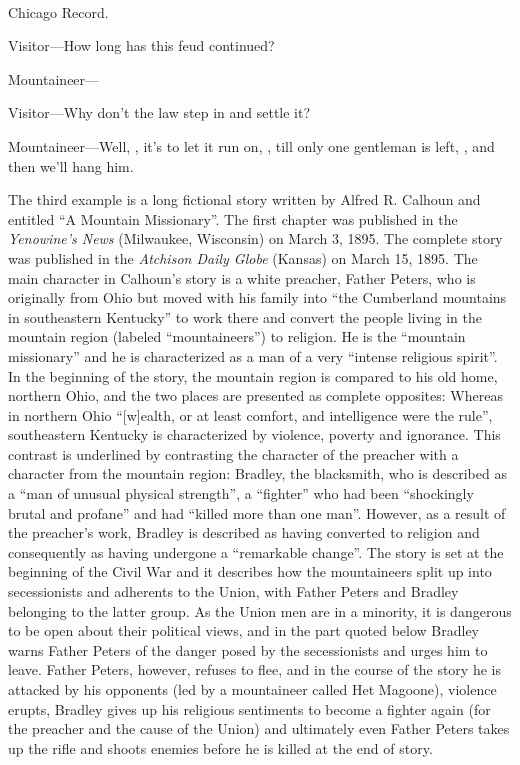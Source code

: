 \begin{ipquote}
\begin{center}
\\
Chicago Record.    
\end{center}

Visitor—How long has this feud continued?

Mountaineer—

Visitor—Why don’t the law step in and settle it?

Mountaineer—Well, , it’s  to let it run on, , till only one gentleman is left, , and then we’ll hang him.
\end{ipquote}

The third example is a long fictional story written by Alfred R. Calhoun and entitled “A Mountain Missionary”. The first chapter was published in the \emph{Yenowine’s News} (Milwaukee, Wisconsin) on March 3, 1895.
The complete story was published in the \emph{Atchison Daily Globe} (Kansas) on March 15, 1895. The main character in Calhoun’s story is a white preacher, Father Peters, who is originally from Ohio but moved with his family into “the Cumberland mountains in southeastern Kentucky” to work there and convert the people living in the mountain region (labeled “mountaineers”) to religion. He is the “mountain missionary” and he is characterized as a man of a very “intense religious spirit”. In the beginning of the story, the mountain region is compared to his old home, northern Ohio, and the two places are presented as complete opposites: Whereas in northern Ohio “[w]ealth, or at least comfort, and intelligence were the rule”, southeastern Kentucky is characterized by violence, poverty and ignorance. This contrast is underlined by contrasting the character of the preacher with a character from the mountain region: Bradley, the blacksmith, who is described as a “man of unusual physical strength”, a “fighter” who had been “shockingly brutal and profane” and had “killed more than one man”. However, as a result of the preacher’s work, Bradley is described as having converted to religion and consequently as having undergone a “remarkable change”. The story is set at the beginning of the Civil War and it describes how the mountaineers split up into secessionists and adherents to the Union, with Father Peters and Bradley belonging to the latter group. As the Union men are in a minority, it is dangerous to be open about their political views, and in the part quoted below Bradley warns Father Peters of the danger posed by the secessionists and urges him to leave. Father Peters, however, refuses to flee, and in the course of the story he is attacked by his opponents (led by a mountaineer called Het Magoone), violence erupts, Bradley gives up his religious sentiments to become a fighter again (for the preacher and the cause of the Union) and ultimately even Father Peters takes up the rifle and shoots enemies before he is killed at the end of story.

